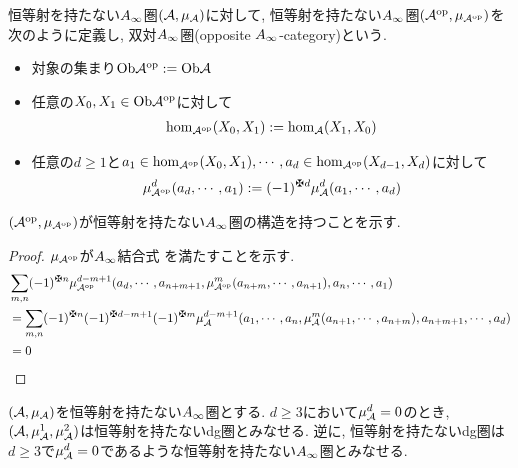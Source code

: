 \documentclass[uplatex, a4paper, 14Q, dvipdfmx]{jsarticle}
\begin{document}
\begin{definition}[双対$\Ainf$圏]
  恒等射を持たない$\Ainf$圏$(\mathcal{A},\mu_{\mathcal{A}})$に対して, 恒等射を持たない$\Ainf$圏$(\mathcal{A}^\mathrm{op},\mu_{\mathcal{A}^\mathrm{op}})$を次のように定義し, 双対$\Ainf$圏(opposite $\Ainf$-category)という. 
  \begin{itemize}
    \item 対象の集まり$\mathrm{Ob}\mathcal{A}^\mathrm{op} := \mathrm{Ob}\mathcal{A}$
    \item 任意の$X_0, X_1 \in \mathrm{Ob}\mathcal{A}^\mathrm{op}$に対して
    \begin{align*}
      \hom_{\mathcal{A}^\mathrm{op}}(X_0,X_1) := \hom_{\mathcal{A}}(X_1,X_0)
    \end{align*}
    \item 任意の$d \geq 1$と$a_1 \in \hom_{\mathcal{A}^\mathrm{op}}(X_0,X_1), \cdots, a_d \in \hom_{\mathcal{A}^\mathrm{op}}(X_{d-1},X_d)$に対して
    \begin{align*}
      \mu^d_{\Aop}(a_d,\cdots,a_1) := (-1)^{\maltese d} \mu^d_\A(a_1,\cdots,a_d)
    \end{align*}
  \end{itemize}
\end{definition}

$(\mathcal{A}^\mathrm{op},\mu_{\mathcal{A}^\mathrm{op}})$が恒等射を持たない$\Ainf$圏の構造を持つことを示す. 

\begin{proof}  
  $\mu_{\mathcal{A}^\mathrm{op}}$が$\Ainf$結合式
  を満たすことを示す.
  \begin{align*}
    & \sum_{m,n} (-1)^{\maltese n} \mu^{d-m+1}_{\Aop} (a_d,\cdots,a_{n+m+1}, \mu^m_{\Aop}(a_{n+m},\cdots,a_{n+1}), a_n,\cdots,a_1) \\
    & = \sum_{m,n} (-1)^{\maltese n} (-1)^{\maltese d-m+1} (-1)^{\maltese m} 
    \mu^{d-m+1}_\A (a_1,\cdots,a_n, \mu^m_\A(a_{n+1},\cdots,a_{n+m}), a_{n+m+1},\cdots,a_d) \\
    & = 0
  \end{align*}
\end{proof}

\begin{example}
  $(\mathcal{A},\mu_{\mathcal{A}})$を恒等射を持たない$\Ainf$圏とする. 
  $d \geq 3$において$\mu^d_{\mathcal{A}}=0$のとき, $(\mathcal{A},\mu^1_{\mathcal{A}},\mu^2_{\mathcal{A}})$は恒等射を持たないdg圏とみなせる. 
  逆に, 恒等射を持たないdg圏は$d \geq 3$で$\mu^d_{\mathcal{A}}=0$であるような恒等射を持たない$\Ainf$圏とみなせる. 
\end{example}
\end{document}
